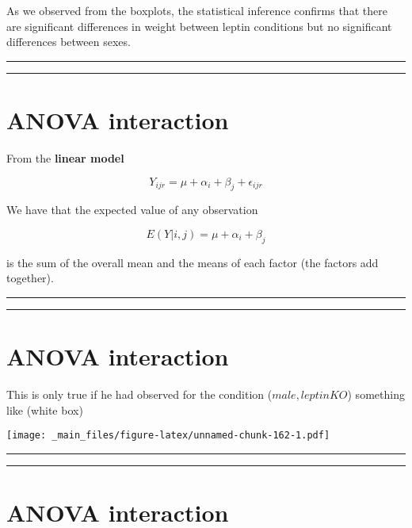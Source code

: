 \documentclass[
]{book}
\begin{document}
As we observed from the boxplots, the statistical inference confirms that there are significant differences in weight between leptin conditions but no significant differences between sexes.

\begin{center}\rule{0.5\linewidth}{0.5pt}\end{center}

\begin{center}\rule{0.5\linewidth}{0.5pt}\end{center}

\hypertarget{anova-interaction}{%
\section{ANOVA interaction}\label{anova-interaction}}

From the \textbf{linear model}

\[Y_{ijr} = \mu + \alpha_i + \beta_j + \epsilon_{ijr}\]

We have that the expected value of any observation

\[E(Y|i,j)=\mu + \alpha_i+ \beta_j\]

is the sum of the overall mean and the means of each factor (the factors add together).

\begin{center}\rule{0.5\linewidth}{0.5pt}\end{center}

\begin{center}\rule{0.5\linewidth}{0.5pt}\end{center}

\hypertarget{anova-interaction-1}{%
\section{ANOVA interaction}\label{anova-interaction-1}}

This is only true if he had observed for the condition (\(male, leptinKO\)) something like (white box)

\texttt{[image: \_main\_files/figure-latex/unnamed-chunk-162-1.pdf]}

\begin{center}\rule{0.5\linewidth}{0.5pt}\end{center}

\begin{center}\rule{0.5\linewidth}{0.5pt}\end{center}

\hypertarget{anova-interaction-2}{%
\section{ANOVA interaction}\label{anova-interaction-2}}
\end{document}
